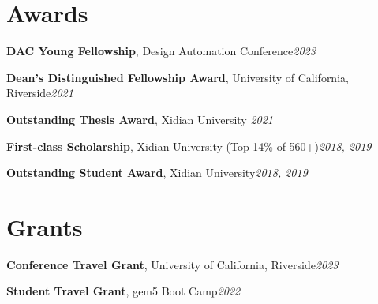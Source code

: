 \documentclass[letterpaper,11pt]{article}
\newcommand{\resumeSubHeadingListStart}{\begin{itemize}[leftmargin=0.15in, label={}]}
\newcommand{\resumeSubHeadingListEnd}{\end{itemize}}
\begin{document}

\section{Awards}
  \vspace{2pt}
  \resumeSubHeadingListStart
    \small{\item{
        \textbf{DAC Young Fellowship}, Design Automation Conference\hfill \textit{2023} \\ \vspace{3pt}
    
        \textbf{Dean’s Distinguished Fellowship Award}, University of California, Riverside\hfill \textit{2021} \\ \vspace{3pt}
        
        \textbf{Outstanding Thesis Award}, Xidian University \hfill \textit{2021} \\ \vspace{3pt}
        
        \textbf{First-class Scholarship}, Xidian University (Top 14\% of 560+)\hfill \textit{2018, 2019} \\ \vspace{3pt}
        
        \textbf{Outstanding Student Award}, Xidian University\hfill \textit{2018, 2019} \\ \vspace{3pt}
    }}
  \resumeSubHeadingListEnd

\section{Grants}
  \vspace{2pt}
  \resumeSubHeadingListStart
    \small{\item{

        \textbf{Conference Travel Grant}, University of California, Riverside\hfill \textit{2023} \\ \vspace{3pt}

        \textbf{Student Travel Grant}, gem5 Boot Camp\hfill \textit{2022} \\ \vspace{3pt}
        
    }}
  \resumeSubHeadingListEnd



\end{document}
